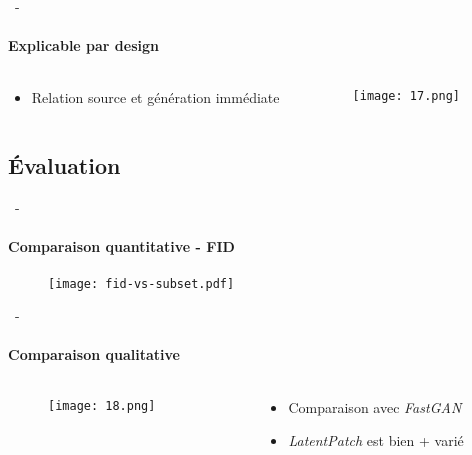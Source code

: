 \documentclass[aspectratio=169, 22pt]{beamer}
\begin{document}
\begin{frame}{\secname~- \subsecname}
  \framesubtitle{Explicable par design}
  \begin{columns}
    \begin{column}{0.4\linewidth}
      \begin{itemize}
      \item Relation \alert{source} et \alert{génération} immédiate
      \end{itemize}
    \end{column}
    \begin{column}{0.6\linewidth}
      \begin{figure}
        \texttt{[image: 17.png]}
      \end{figure}  
    \end{column}
  \end{columns}  
\end{frame}

\subsection{Évaluation}
\begin{frame}{\secname~- \subsecname}
  \framesubtitle{Comparaison quantitative - FID}
  \begin{figure}
    \texttt{[image: fid-vs-subset.pdf]}
  \end{figure}
\end{frame}

\begin{frame}{\secname~- \subsecname}
  \framesubtitle{Comparaison qualitative}
  \begin{columns}
    \begin{column}{0.75\linewidth}
      \begin{figure}
        \texttt{[image: 18.png]}
      \end{figure}
    \end{column}
    \begin{column}{0.25\linewidth}
      \begin{itemize}
      \item Comparaison avec \emph{FastGAN}
      \item \emph{LatentPatch} est bien + varié
      \end{itemize}
    \end{column}
  \end{columns}  
\end{frame}
\end{document}

